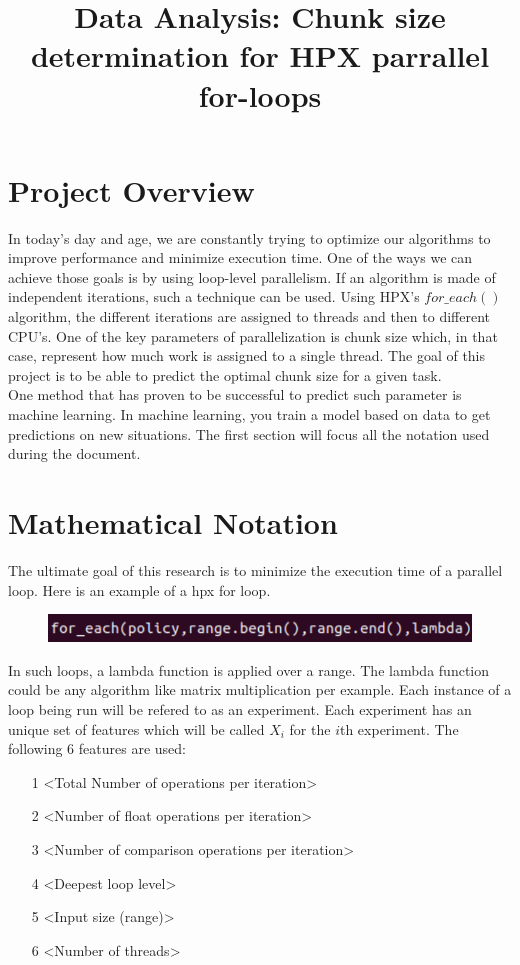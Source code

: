 \documentclass[12pt]{article}
\title{Data Analysis: Chunk size determination for HPX parrallel for-loops }
\begin{document}
\newpage
\section*{Project Overview}
 In today's day and age, we are constantly trying to optimize our algorithms to improve performance and minimize execution time. One of the ways we can achieve those goals is by using loop-level parallelism. If an algorithm is made of independent iterations, such a technique can be used. Using HPX's $for\_each()$ algorithm, the different iterations are assigned to threads and then to different CPU's. One of the key parameters of parallelization is chunk size which, in that case, represent how much work is assigned to a single thread.
The goal of this project is to be able to predict the optimal chunk size for a given task. \\

One method that has proven to be successful to predict such parameter is machine learning. In machine learning, you train a model based on data to get predictions on new situations. The first section will focus all the notation used during the document.

\section{Mathematical Notation}
The ultimate goal of this research is to minimize the execution time of a parallel loop. Here is an example of a hpx for loop. 

\begin{figure}[h]
	\centering
	\includegraphics[scale=0.8]{images/for_each_call.pdf}
\end{figure}

In such loops, a lambda function is applied over a range. The lambda function could be any algorithm like matrix multiplication per example. Each instance of a loop being run will be refered to as an experiment. Each experiment has an unique set of features which will be called $X_i$ for the $i$th experiment. The following 6 features are used:

\begin{itemize}
	\item[1] <Total Number of operations per iteration>
	\item[2] <Number of float operations per iteration>
	\item[3] <Number of comparison operations per iteration>
	\item[4] <Deepest loop level>
	\item[5] <Input size (range)>
	\item[6] <Number of threads>
\end{itemize}
\end{document}
